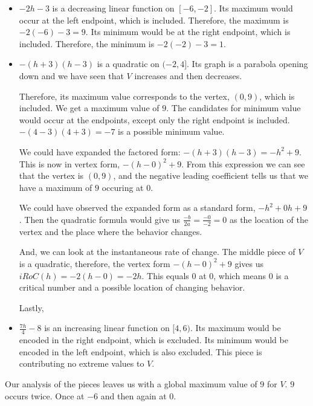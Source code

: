 \documentclass{ximera}
\begin{document}
\begin{itemize}
  \item \textbf{$-2h-3$} is a decreasing linear function on $[-6, -2]$.  Its maximum would occur at the left endpoint, which is included. Therefore, the maximum is $-2(-6)-3 = 9$. Its minimum would be at the right endpoint, which is included. Therefore, the minimum is $-2(-2)-3 = 1$.

  \item \textbf{$-(h+3)(h-3)$} is a quadratic on $(-2, 4]$.  Its graph is a parabola opening down and we have seen that $V$ increases and then decreases.  

  Therefore, its maximum value corresponds to the vertex, $(0, 9)$, which is included.  We get a maximum value of $9$.  The candidates for minimum value would occur at the endpoints, except only the right endpoint is included.  $-(4-3)(4+3) = -7$ is a possible minimum value.


\begin{observation}


We could have expanded the factored form: $-(h+3)(h-3) = -h^2 + 9$.  This is now in vertex form, $-(h-0)^2 + 9$. From this expression we can see that the vertex is $(0, 9)$, and the negative leading coefficient tells us that we have a maximum of $9$ occuring at $0$.


We could have observed the expanded form as a standard form, $-h^2 + 0 h + 9$.  Then the quadratic formula would give us $\frac{-b}{2a} = \frac{-0}{-2} = 0$ as the location of the vertex and the place where the behavior changes.


And, we can look at the instantaneous rate of change. The middle piece of $V$ is a quadratic, therefore, the vertex form $-(h-0)^2 + 9$ gives us $iRoC(h) = -2(h-0) = -2h$.  This equals $0$ at $0$, which means $0$ is a critical number and a possible location of changing behavior.

\end{observation}
Lastly, \\


  \item \textbf{$\frac{7h}{4} - 8$} is an increasing linear function on $[4, 6)$.  Its maximum would be encoded in the right endpoint, which is excluded. Its minimum would be encoded in the left endpoint, which is also excluded. This piece is contributing no extreme values to $V$.
\end{itemize}


Our analysis of the pieces leaves us with a global maximum value of $9$ for $V$.  $9$ occurs twice.  Once at $-6$ and then again at $0$.
\end{document}
